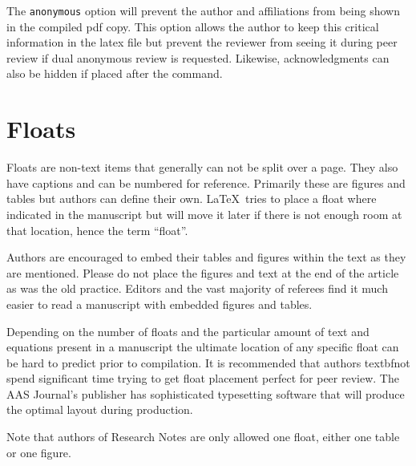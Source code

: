 \documentclass{aastex63}
\newcommand\latex{La\TeX}
\begin{document}
The {\tt\string anonymous} option will prevent the author and affiliations
from being shown in the compiled pdf copy. This option allows the author 
to keep this critical information in the latex file but prevent the reviewer
from seeing it during peer review if dual anonymous review is requested. 
Likewise, acknowledgments can also be hidden if placed after the 
{\tt\string\acknowledgments} command.

\section{Floats} \label{sec:floats}

Floats are non-text items that generally can not be split over a page.
They also have captions and can be numbered for reference.  Primarily these
are figures and tables but authors can define their own. \latex\ tries to
place a float where indicated in the manuscript but will move it later if
there is not enough room at that location, hence the term ``float''.

Authors are encouraged to embed their tables and figures within the text as
they are mentioned.  Please do not place the figures and text at the end of
the article as was the old practice.  Editors and the vast majority of
referees find it much easier to read a manuscript with embedded figures and
tables.

Depending on the number of floats and the particular amount of text and
equations present in a manuscript the ultimate location of any specific
float can be hard to predict prior to compilation. It is recommended that
authors textbf{not} spend significant time trying to get float placement
perfect for peer review.  The AAS Journal's publisher has sophisticated
typesetting software that will produce the optimal layout during
production.

Note that authors of Research Notes are only allowed one float, either one
table or one figure.
\end{document}
